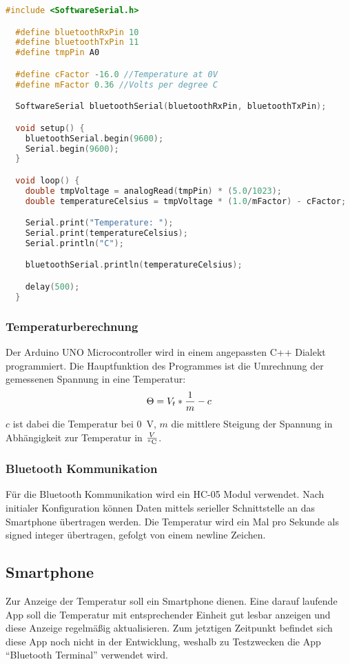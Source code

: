 \documentclass{article}
\begin{document}
  \begin{lstlisting}[language=C++, caption={Arduino code}]
  #include <SoftwareSerial.h>

  #define bluetoothRxPin 10
  #define bluetoothTxPin 11
  #define tmpPin A0

  #define cFactor -16.0 //Temperature at 0V
  #define mFactor 0.36 //Volts per degree C

  SoftwareSerial bluetoothSerial(bluetoothRxPin, bluetoothTxPin);

  void setup() {
    bluetoothSerial.begin(9600);
    Serial.begin(9600);
  }

  void loop() {
    double tmpVoltage = analogRead(tmpPin) * (5.0/1023);
    double temperatureCelsius = tmpVoltage * (1.0/mFactor) - cFactor;

    Serial.print("Temperature: ");
    Serial.print(temperatureCelsius);
    Serial.println("C");

    bluetoothSerial.println(temperatureCelsius);

    delay(500);
  }
  \end{lstlisting}

  \subsubsection{Temperaturberechnung}
    Der Arduino UNO Microcontroller wird in einem angepassten C++ Dialekt
    programmiert. Die Hauptfunktion des Programmes ist die Umrechnung der gemessenen
    Spannung in eine Temperatur:
    \[
    \Theta = V_{t} * {1 \over m} - c
    \]
    $c$ ist dabei die Temperatur bei \SI{0}{\volt}, $m$ die mittlere Steigung der
    Spannung in Abhängigkeit zur Temperatur in $V \over \si{\degreeCelsius}$.

  \subsubsection{Bluetooth Kommunikation}
    Für die Bluetooth Kommunikation wird ein HC-05 Modul verwendet. Nach
    initialer Konfiguration können Daten mittels serieller Schnittstelle an das
    Smartphone übertragen werden. Die Temperatur wird ein Mal pro Sekunde als
    signed integer übertragen, gefolgt von einem newline Zeichen.

  \subsection{Smartphone}
    Zur Anzeige der Temperatur soll ein Smartphone dienen. Eine darauf laufende
    App soll die Temperatur mit entsprechender Einheit gut lesbar anzeigen und
    diese Anzeige regelmäßig aktualisieren. Zum jetztigen Zeitpunkt befindet
    sich diese App noch nicht in der Entwicklung, weshalb zu Testzwecken die App
    \enquote{Bluetooth Terminal} \cite{bluetoothTerminal} verwendet wird.



\end{document}
